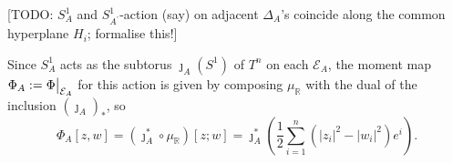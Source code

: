 \documentclass{article}
\newcommand{\RR}{\mathbb{R}}
\newcommand{\mcE}{\mathcal{E}}
\newcommand\restr[2]{{%
		\left.\kern-\nulldelimiterspace %
		#1 %
		\vphantom{\big|} %
		\right|_{#2} %
}}
\begin{document}
	[TODO: $S^{1}_{A}$ and $S_{A^{\prime}}^{1}$-action (say) on adjacent $\Delta_{A}$'s coincide along the common hyperplane $H_{i}$; formalise this!]
	
	Since $S_{A}^{1}$ acts as the subtorus $\jmath_{A}(S^{1})$ of $T^{n}$ on each $\mcE_{A}$, the moment map $\Phi_{A} := \restr{\Phi}{\mcE_{A}}$ for this action is given by composing $\mu_{\RR}$ with the dual of the inclusion $(\jmath_{A})_{\ast}$, so
	\[
		\Phi_{A}[z,w] = \left( \jmath_{A}^{\ast} \circ \mu_{\RR} \right)[z;w] = \jmath_{A}^{\ast} \left( \frac{1}{2} \sum_{i = 1}^{n} \left( |z_{i}|^{2} - |w_{i}|^{2} \right) e^{i} \right).
	\]
	
	
	  
	
	
\end{document}
